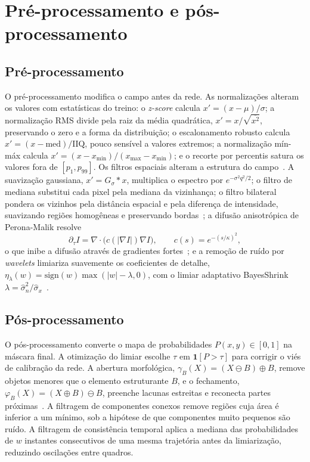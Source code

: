 \documentclass[final,5p,times,twocolumn]{elsarticle}
\newcommand{\ind}{\mathbf{1}}
\begin{document}
\section{Pré-processamento e pós-processamento}\label{sec:sec4}

\subsection{Pré-processamento}\label{subsec:pretheory}

O pré-processamento modifica o campo antes da rede. As normalizações alteram os valores com estatísticas do treino: o \textit{z-score} calcula $x'=(x-\mu)/\sigma$; a normalização RMS divide pela raiz da média quadrática, $x'=x/\sqrt{\overline{x^2}}$, preservando o zero e a forma da distribuição; o escalonamento robusto calcula $x'=(x-\mathrm{med})/\mathrm{IIQ}$, pouco sensível a valores extremos; a normalização mín-máx calcula $x'=(x-x_{\min})/(x_{\max}-x_{\min})$; e o recorte por percentis satura os valores fora de $[p_1,p_{99}]$. Os filtros espaciais alteram a estrutura do campo~\cite{gonzalez2018}. A suavização gaussiana, $x'=G_\sigma * x$, multiplica o espectro por $e^{-\sigma^2q^2/2}$; o filtro de mediana substitui cada pixel pela mediana da vizinhança; o filtro bilateral pondera os vizinhos pela distância espacial e pela diferença de intensidade, suavizando regiões homogêneas e preservando bordas~\cite{tomasi1998}; a difusão anisotrópica de Perona-Malik resolve
\begin{equation}\label{eq:pm}
\partial_\tau I=\nabla\cdot\big(c(|\nabla I|)\nabla I\big),\qquad c(s)=e^{-(s/\kappa)^2},
\end{equation}
o que inibe a difusão através de gradientes fortes~\cite{perona1990}; e a remoção de ruído por \textit{wavelets} limiariza suavemente os coeficientes de detalhe, $\eta_\lambda(w)=\mathrm{sign}(w)\max(|w|-\lambda,0)$, com o limiar adaptativo BayesShrink $\lambda=\hat\sigma_n^2/\hat\sigma_x$~\cite{donoho1994,chang2000,daubechies1992}.

\subsection{Pós-processamento}\label{subsec:posttheory}

O pós-processamento converte o mapa de probabilidades $P(x,y)\in[0,1]$ na máscara final. A otimização do limiar escolhe $\tau$ em $\ind[P>\tau]$ para corrigir o viés de calibração da rede. A abertura morfológica, $\gamma_B(X)=(X\ominus B)\oplus B$, remove objetos menores que o elemento estruturante $B$, e o fechamento, $\varphi_B(X)=(X\oplus B)\ominus B$, preenche lacunas estreitas e reconecta partes próximas~\cite{serra1982,soille2003}. A filtragem de componentes conexos remove regiões cuja área é inferior a um mínimo, sob a hipótese de que componentes muito pequenos são ruído. A filtragem de consistência temporal aplica a mediana das probabilidades de $w$ instantes consecutivos de uma mesma trajetória antes da limiarização, reduzindo oscilações entre quadros.
\end{document}
